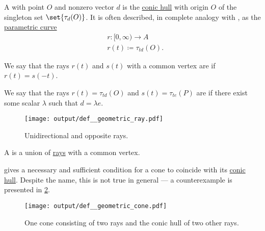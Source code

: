 \begin{definition}\label{def:geometric_ray}\mimprovised
  A  with  point \( O \) and nonzero  vector \( d \) is the \hyperref[def:conic_hull]{conic hull} with origin \( O \) of the singleton set \( \set{ \tau_d(O) } \). It is often described, in complete analogy with , as the \hyperref[def:parametric_curve]{parametric curve}
  \begin{equation*}
    \begin{aligned}
       &r: [0, \infty) \to A \\
       &r(t) \coloneqq \tau_{td}(O).
    \end{aligned}
  \end{equation*}

  \begin{thmenum}
     We say that the rays \( r(t) \) and \( s(t) \) with a common vertex are  if \( r(t) = s(-t) \).

     We say that the rays \( r(t) = \tau_{t d}(O) \) and \( s(t) = \tau_{t e}(P) \) are  if there exist some  scalar \( \lambda \) such that \( d = \lambda e \).
  \end{thmenum}

  \begin{figure}[!ht]
    \centering
    \texttt{[image: output/def\_\_geometric\_ray.pdf]}
    \caption{Unidirectional and opposite rays.}\label{fig:def:geometric_ray}
  \end{figure}
\end{definition}

\begin{definition}\label{def:geometric_cone}
  A  is a union of \hyperref[def:geometric_ray]{rays} with a common vertex.

   gives a necessary and sufficient condition for a cone to coincide with its \hyperref[def:conic_hull]{conic hull}. Despite the name, this is not true in general --- a counterexample is presented in \cref{fig:def:geometric_cone}.

  \begin{figure}[!ht]
    \centering
    \texttt{[image: output/def\_\_geometric\_cone.pdf]}
    \caption{One cone consisting of two rays and the conic hull of two other rays.}\label{fig:def:geometric_cone}
  \end{figure}
\end{definition}

